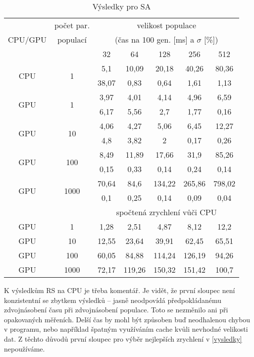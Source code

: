 \begin{table}[b]
    \begin{center}
    \begin{tabular}{ccccccc}
      \toprule
      \midrule
      \multirow{3}{*}{CPU/GPU} & počet par. & \multicolumn{5}{c}{velikost populace} \\
      & populací & \multicolumn{5}{c}{(čas na 100 gen. [ms] a $\sigma$ [\%])} \\
      & & 32 & 64 & 128 & 256 & 512 \\
      \midrule
      \multirow{2}{*}{CPU} & \multirow{2}{*}{1}
&5,1&10,09&20,18&40,26&80,36\\
&&38,07&0,83&0,64&1,61&1,13\vspace{1.5mm}\\
\multirow{2}{*}{GPU} & \multirow{2}{*}{1}
&3,97&4,01&4,14&4,96&6,59\\
&&6,17&5,56&2,7&1,77&0,16\vspace{1.5mm}\\
\multirow{2}{*}{GPU} & \multirow{2}{*}{10}
&4,06&4,27&5,06&6,45&12,27\\
&&4,8&3,82&2&0,17&0,26\vspace{1.5mm}\\
\multirow{2}{*}{GPU} & \multirow{2}{*}{100}
&8,49&11,89&17,66&31,9&85,26\\
&&0,15&0,33&0,14&0,24&0,14\vspace{1.5mm}\\
\multirow{2}{*}{GPU} & \multirow{2}{*}{1000}
&70,64&84,6&134,22&265,86&798,02\\
&&0,1&0,25&0,14&0,09&0,04\\
\midrule
      & & \multicolumn{5}{c}{spočtená zrychlení vůči CPU} \\
\midrule
      GPU & 1
&1,28&2,51&4,87&8,12&12,2\\
GPU & 10
&12,55&23,64&39,91&62,45&65,51\\
GPU & 100
&60,05&84,88&114,24&126,19&94,26\\
GPU & 1000
&72,17&119,26&150,32&151,42&100,7\\
\midrule
      \bottomrule
    \end{tabular}
    \caption{Výsledky pro SA}
    \end{center}
\end{table}
\clearpage

K výsledkům RS na CPU je třeba komentář. Je vidět, že první sloupec není konzistentní se zbytkem výsledků -- jasně neodpovídá předpokládanému zdvojnásobení času při zdvojnásobení populace. Toto se nezměnilo ani při opakovaných měřeních. Delší čas by mohl být způsoben buď neodhalenou chybou v programu, nebo například špatným využíváním cache kvůli nevhodné velikosti dat. Z těchto důvodů první sloupec pro výběr nejlepších zrychlení v \ref{vysledky} nepoužíváme.

